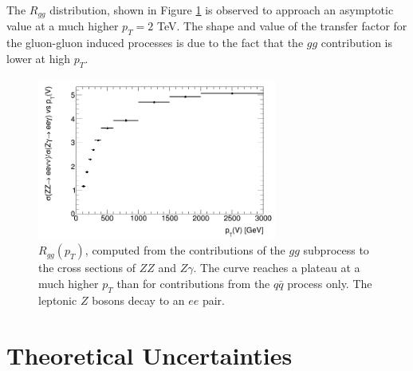 \documentclass[12pt,a4paper,openright,twoside]{report}
\begin{document}
The $R_{gg}$ distribution, shown in Figure \ref{fig:R_ggonly} is observed to approach an asymptotic value at a much higher $p_T = 2$ TeV. The shape and value of the transfer factor for the gluon-gluon induced processes is due to the fact that the $gg$ contribution is lower at high $p_T$. 

\begin{figure}[H]
\centering
\includegraphics[width=0.7\textwidth]{Rgg.png}
\caption{$R_{gg}(p_T)$, computed from the contributions of the $gg$ subprocess to the cross sections of $ZZ$ and $Z\gamma$. The curve reaches a plateau at a much higher $p_T$ than for contributions from the $q\bar{q}$ process only. The leptonic $Z$ bosons decay to an $ee$ pair.}
\label{fig:R_ggonly}
\end{figure}

\section{Theoretical Uncertainties}
\end{document}
